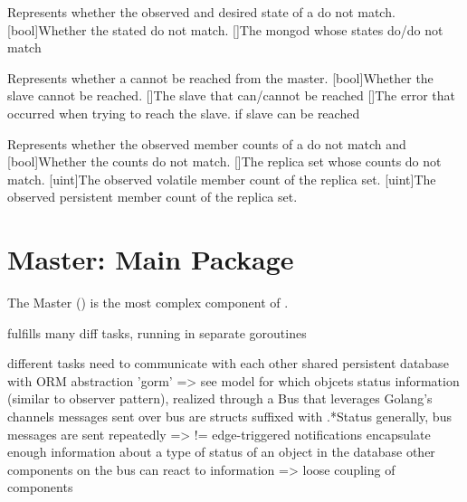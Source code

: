 {
  Represents whether the observed and desired state of a  do not match.
}{
  [bool]{Whether the stated do not match.}
  []{The mongod whose states do/do not match}
}

{
  Represents whether a  cannot be reached from the master.
}{
  [bool]{Whether the slave cannot be reached.}
  []{The slave that can/cannot be reached}
  []{The error that occurred when trying to reach the slave.  if slave can be reached}
}

{
  Represents whether the observed member counts of a  do not match  and 
}{
  [bool]{Whether the counts do not match.}
  []{The replica set whose counts do not match.}
  [uint]{The observed volatile member count of the replica set.}
  [uint]{The observed persistent member count of the replica set.}
}


\section{Master: Main Package}
\renewcommand{\gocurpackage}{master}

The Master () is the most complex component of \mamid.

fulfills many diff tasks, running in separate goroutines

different tasks need to communicate with each other
  shared persistent database with ORM abstraction 'gorm' => see model for which objcets
  status information (similar to observer pattern), realized through a Bus that leverages Golang's channels
    messages sent over bus are structs suffixed with .*Status
    generally, bus messages are sent repeatedly => != edge-triggered notifications
    encapsulate enough information about a type of status of an object in the database
      other components on the bus can react to information
=> loose coupling of components


